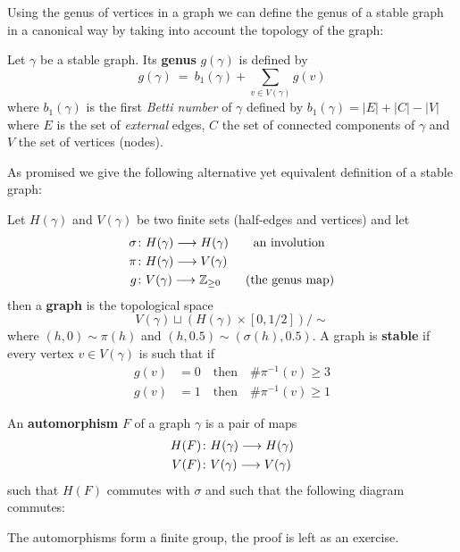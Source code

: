 Using the genus of vertices in a graph we can define the genus of a stable graph in a canonical way by taking into account the topology of the graph:

\begin{definition}
  Let $\gamma$ be a stable graph. Its \textbf{genus} $g(\gamma)$ is defined by
  $$ g(\gamma) \ = \ b_1(\gamma) + \sum_{v\in V(\gamma)} g(v) $$
  where $b_1(\gamma)$ is the first \emph{Betti number} of $\gamma$ defined by $b_1(\gamma) = |E| + |C| - |V|$ where $E$ is the set of \emph{external} edges, $C$ the set of connected components of $\gamma$ and $V$ the set of vertices (nodes).
\end{definition}

As promised we give the following alternative yet equivalent definition of a stable graph:

\begin{definition}
  Let $H(\gamma)$ and $V(\gamma)$ be two finite sets (half-edges and vertices) and let
  \begin{align}
    \sigma &\colon H(\gamma) \longrightarrow H(\gamma) \quad \quad \text{an involution}\\
    \pi &\colon H(\gamma) \longrightarrow V(\gamma)\\
    g &\colon V(\gamma) \longrightarrow \mathbb{Z}_{\geq 0} \quad \quad \text{(the genus map)}
  \end{align}
  then a \textbf{graph} is the topological space
  $$ V(\gamma) \sqcup (H(\gamma) \times [0, 1/2]) / \sim $$
  where $(h,0) \sim \pi(h)$ and $(h,0.5) \sim (\sigma(h), 0.5)$. A graph is \textbf{stable} if every vertex $v \in V(\gamma)$ is such that if
  \begin{align}
    g(v) &= 0 \quad \text{then} \quad \# \pi^{-1}(v) \geq 3\\
    g(v) &= 1 \quad \text{then} \quad \# \pi^{-1}(v) \geq 1
  \end{align}
\end{definition}

\begin{definition}
  An \textbf{automorphism} $F$ of a graph $\gamma$ is a pair of maps
  \begin{align}
    H(F) &\colon H(\gamma) \longrightarrow H(\gamma)\\
    V(F) &\colon V(\gamma) \longrightarrow V(\gamma)
  \end{align}
  such that $H(F)$ commutes with $\sigma$ and such that the following diagram commutes:
  \begin{center}
  \end{center}
  The automorphisms form a finite group, the proof is left as an exercise.
\end{definition}


